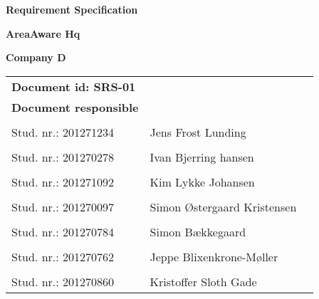 
\centerline{\Huge\bfseries\color{ThemeColor} Requirement Specification } 

\vspace{1em}
\centerline{\Large\bfseries\color{BlackColor} AreaAware Hq} 

\vspace{5em}
\centerline{\large\bfseries\color{BlackColor}Company D} 




\begin{center}
	\begin{tabular}{ l l p{6cm} }
		\textbf{Document id: SRS-01}& & \\
		\textbf{Document responsible}& & \\
		& & \\
		Stud. nr.: 201271234 & Jens Frost Lunding & \\\hline
		& & \\
		Stud. nr.: 201270278 & Ivan Bjerring hansen & \\\hline
		& & \\
		Stud. nr.: 201271092 & Kim Lykke Johansen & \\\hline
		& & \\	
		Stud. nr.: 201270097 & Simon Østergaard Kristensen & \\\hline
		& & \\
		Stud. nr.: 201270784  & Simon Bækkegaard & \\\hline
		& & \\
		Stud. nr.: 	201270762 & Jeppe Blixenkrone-Møller & \\\hline
		& & \\
		Stud. nr.: 	201270860 & Kristoffer Sloth Gade & \\\hline
	\end{tabular}     	
\end{center}
\thispagestyle{empty} %
\restoregeometry



		